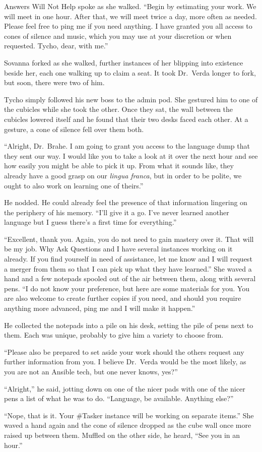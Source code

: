 Answers Will Not Help spoke as she walked. ``Begin by estimating your work. We will meet in one hour. After that, we will meet twice a day, more often as needed. Please feel free to ping me if you need anything. I have granted you all access to cones of silence and music, which you may use at your discretion or when requested. Tycho, dear, with me.''

Sovanna forked as she walked, further instances of her blipping into existence beside her, each one walking up to claim a seat. It took Dr.~Verda longer to fork, but soon, there were two of him.

Tycho simply followed his new boss to the admin pod. She gestured him to one of the cubicles while she took the other. Once they sat, the wall between the cubicles lowered itself and he found that their two desks faced each other. At a gesture, a cone of silence fell over them both.

``Alright, Dr.~Brahe. I am going to grant you access to the language dump that they sent our way. I would like you to take a look at it over the next hour and see how easily you might be able to pick it up. From what it sounds like, they already have a good grasp on our \emph{lingua franca}, but in order to be polite, we ought to also work on learning one of theirs.''

He nodded. He could already feel the presence of that information lingering on the periphery of his memory. ``I'll give it a go. I've never learned another language but I guess there's a first time for everything.''

``Excellent, thank you. Again, you do not need to gain mastery over it. That will be my job. Why Ask Questions and I have several instances working on it already. If you find yourself in need of assistance, let me know and I will request a merger from them so that I can pick up what they have learned.'' She waved a hand and a few notepads spooled out of the air between them, along with several pens. ``I do not know your preference, but here are some materials for you. You are also welcome to create further copies if you need, and should you require anything more advanced, ping me and I will make it happen.''

He collected the notepads into a pile on his desk, setting the pile of pens next to them. Each was unique, probably to give him a variety to choose from.

``Please also be prepared to set aside your work should the others request any further information from you. I believe Dr.~Verda would be the most likely, as you are not an Ansible tech, but one never knows, yes?''

``Alright,'' he said, jotting down on one of the nicer pads with one of the nicer pens a list of what he was to do. ``Language, be available. Anything else?''

``Nope, that is it. Your \#Tasker instance will be working on separate items.'' She waved a hand again and the cone of silence dropped as the cube wall once more raised up between them. Muffled on the other side, he heard, ``See you in an hour.''
